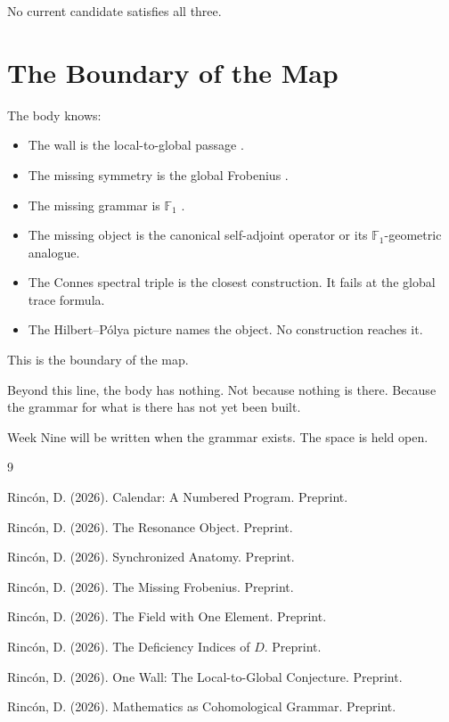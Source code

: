 \documentclass[12pt]{article}
\theoremstyle{definition}
\theoremstyle{remark}
\begin{document}
No current candidate satisfies all three.

\section{The Boundary of the Map}

The body knows:
\begin{itemize}
\item The wall is the local-to-global passage \cite{one_wall}.
\item The missing symmetry is the global Frobenius \cite{frobenius}.
\item The missing grammar is $\mathbb{F}_1$ \cite{f1}.
\item The missing object is the canonical self-adjoint operator
  or its $\mathbb{F}_1$-geometric analogue.
\item The Connes spectral triple is the closest construction.
  It fails at the global trace formula.
\item The Hilbert--P\'olya picture names the object.
  No construction reaches it.
\end{itemize}

This is the boundary of the map.

Beyond this line, the body has nothing.
Not because nothing is there.
Because the grammar for what is there has not yet been built.

Week Nine will be written when the grammar exists.
The space is held open.

\begin{thebibliography}{9}

Rinc\'on, D. (2026). Calendar: A Numbered Program. Preprint.

Rinc\'on, D. (2026). The Resonance Object. Preprint.

Rinc\'on, D. (2026). Synchronized Anatomy. Preprint.

Rinc\'on, D. (2026). The Missing Frobenius. Preprint.

Rinc\'on, D. (2026). The Field with One Element. Preprint.

Rinc\'on, D. (2026). The Deficiency Indices of $D$. Preprint.

Rinc\'on, D. (2026). One Wall: The Local-to-Global Conjecture. Preprint.

Rinc\'on, D. (2026). Mathematics as Cohomological Grammar. Preprint.

\end{thebibliography}
\end{document}
